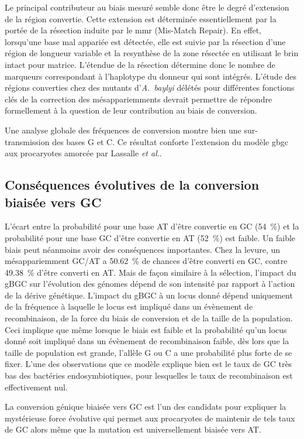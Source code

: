 Le principal contributeur au biais mesuré semble donc être le degré d'extension
de la région convertie. Cette extension est déterminée essentiellement par la
portée de la résection induite par le \ac{mmr} (Mis-Match Repair). En effet,
lorsqu'une base mal appariée est détectée, elle est suivie par la résection
d'une région de longueur variable et la resynthèse de la zone résectée en
utilisant le brin intact pour matrice\cite{spies_mismatch_2015}. L'étendue de la
résection détermine donc le nombre de marqueurs correspondant à l'haplotype du
donneur qui sont intégrés. L'étude des régions converties chez des mutants
d'\emph{A.~baylyi} délétés pour différentes fonctions clés de la correction des
mésappariemments devrait permettre de répondre formellement à la question de
leur contribution au biais de conversion.

Une analyse globale des fréquences de conversion montre bien une
sur-transmission des bases G et C. Ce résultat conforte l'extension du modèle
\ac{gbgc} aux procaryotes amorcée par Lassalle \textit{et
  al.}\cite{lassalle_gc-content_2015}.

\subsection{Conséquences évolutives de la conversion biaisée vers GC}
\label{subsec:discu-conséquences}

L'écart entre la probabilité pour une base AT d'être convertie en GC
(\SI{54}{\percent}) et la probabilité pour une base GC d'être convertie en AT
(\SI{52}{\percent}) est faible. Un faible biais peut néanmoins avoir des
conséquences importantes. Chez la levure, un mésappariemment GC/AT a
\SI{50.62}{\percent} de chances d'être converti en GC, contre
\SI{49.38}{\percent} d'être converti en
AT\cite{mancera_high-resolution_2008,duret_biased_2009}. Mais de façon similaire
à la sélection, l'impact du gBGC sur l'évolution des génomes dépend de son
intensité par rapport à l'action de la dérive génétique. L'impact du gBGC à un
locus donné dépend uniquement de la fréquence à laquelle le locus est impliqué
dans un évènement de recombinaison, de la force du biais de conversion et de la
taille de la
population\cite{nagylaki_evolution_1983,lassalle_gc-content_2015,duret_biased_2009,duret_impact_2008}.
Ceci implique que même lorsque le biais est faible et la probabilité qu'un locus
donné soit impliqué dans un évènement de recombinaison faible, dès lors que la
taille de population est grande, l'allèle G ou C a une probabilité plus forte de
se fixer. L'une des observations que ce modèle explique bien est le taux de GC
très bas des bactéries endosymbiotiques, pour lesquelles le taux de
recombinaison est effectivement nul\cite{moran_genomics_2008}.

La conversion génique biaisée vers GC est l'un des candidats pour expliquer la
mystérieuse force évolutive qui permet aux procaryotes de maintenir de tels taux
de GC alors même que la mutation est universellement biaisée vers
AT\cite{hildebrand_evidence_2010,hershberg_evidence_2010}.

